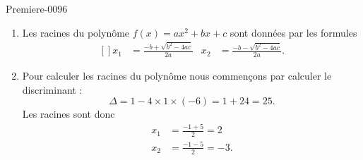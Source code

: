 
\begin{corrige}{Premiere-0096}

    \begin{enumerate}
        \item
            Les racines du polynôme \( f(x)=ax^2+bx+c\) sont données par les formules
            \begin{equation}
                \begin{aligned}[]
                    x_1&=\frac{ -b+\sqrt{b^2-4ac} }{ 2a }&x_2&=\frac{ -b-\sqrt{b^2-4ac} }{ 2a }.
                \end{aligned}
            \end{equation}
        \item
            Pour calculer les racines du polynôme nous commençons par calculer le discriminant :
            \begin{equation}
                \Delta=1-4\times1\times (-6)=1+24=25.
            \end{equation}
            Les racines sont donc
            \begin{subequations}
                \begin{align}
                    x_1&=\frac{ -1+5 }{2}=2\\
                    x_2&=\frac{ -1-5 }{2}=-3.
                \end{align}
            \end{subequations}
    \end{enumerate}

\end{corrige}
